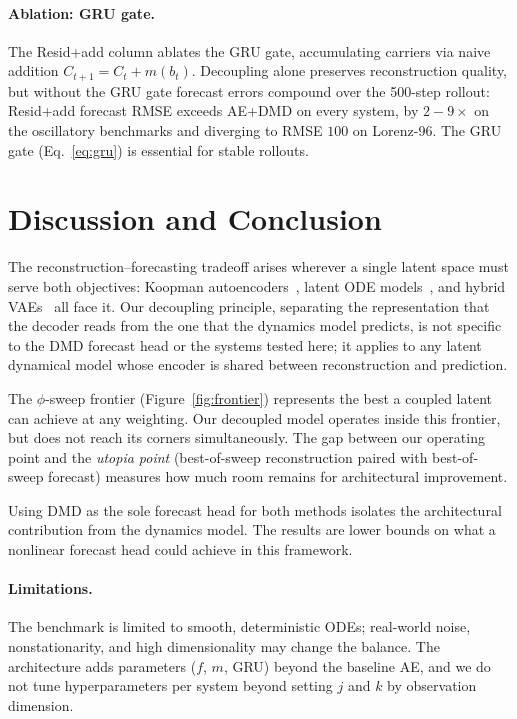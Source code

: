 \documentclass{article}
\begin{document}
\paragraph{Ablation: GRU gate.}
The Resid+add column ablates the GRU gate, accumulating carriers via naive
addition $C_{t+1} = C_t + m(b_t)$.  Decoupling alone preserves reconstruction
quality, but without the GRU gate forecast errors compound over the 500-step
rollout: Resid+add forecast RMSE exceeds AE+DMD on every system, by
$2{-}9\times$ on the oscillatory benchmarks and diverging to RMSE $100$ on
Lorenz-96.  The GRU gate (Eq.~\ref{eq:gru}) is essential for stable rollouts.

\section{Discussion and Conclusion}

The reconstruction--forecasting tradeoff arises wherever a single latent space
must serve both objectives: Koopman autoencoders~\citep{lusch2018deep,otto2019linearly},
latent ODE models~\citep{chen2018neural,rubanova2019latent}, and hybrid
VAEs~\citep{cai2023hyvae} all face it.  Our decoupling principle, separating the
representation that the decoder reads from the one that the dynamics model
predicts, is not specific to the DMD forecast head or the systems tested here;
it applies to any latent dynamical model whose encoder is shared between
reconstruction and prediction.

The $\phi$-sweep frontier (Figure~\ref{fig:frontier}) represents the best a
coupled latent can achieve at any weighting.  Our decoupled model operates
inside this frontier, but does not reach its corners simultaneously.  The gap
between our operating point and the \emph{utopia point} (best-of-sweep
reconstruction paired with best-of-sweep forecast) measures how much room
remains for architectural improvement.

Using DMD as the sole forecast head for both methods isolates the architectural
contribution from the dynamics model.  The results are lower bounds on what a
nonlinear forecast head could achieve in this framework.

\paragraph{Limitations.}
The benchmark is limited to smooth, deterministic ODEs; real-world noise,
nonstationarity, and high dimensionality may change the balance.  The
architecture adds parameters ($f$, $m$, GRU) beyond the baseline AE, and we do
not tune hyperparameters per system beyond setting $j$ and $k$ by observation
dimension.
\end{document}
